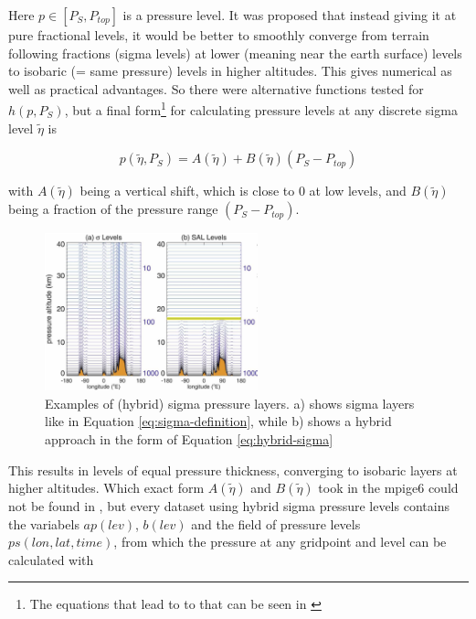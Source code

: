 Here $p \in [P_S, P_{top}]$ is a pressure level. 
It was proposed that instead giving it at pure fractional levels, it would be better to smoothly converge from terrain following fractions (sigma levels) at lower (meaning near the earth surface) levels to isobaric (= same pressure) levels in higher altitudes. 
This gives numerical as well as practical advantages.
So there were alternative functions tested for $h(p, P_S)$, but a final form\footnote{The equations that lead to to that can be seen in \cite{eckermann_hybrid_2009}} for calculating pressure levels at any discrete sigma level $\tilde{\eta}$ is

\begin{equation}
\label{eq:hybrid-sigma}
p(\tilde{\eta}, P_S) = A(\tilde{\eta}) + B(\tilde{\eta}) (P_S - P_{top})
\end{equation}


with $A(\tilde{\eta})$ being a vertical shift, which is close to 0 at low levels, and $B(\tilde{\eta})$ being a fraction of the pressure range $(P_S - P_{top})$. 

\begin{figure}
  \begin{center}
    \includegraphics[width=0.55\textwidth]{figures/hybrid_sigma_pressure_layers.png}
  \end{center}
  \caption{Examples of (hybrid) sigma pressure layers. a) shows sigma layers like in Equation \ref{eq:sigma-definition}, while b) shows a hybrid approach in the form of Equation \ref{eq:hybrid-sigma} \cite{eckermann_hybrid_2009}}\label{fig:hybrid-sigma}
\end{figure}



This results in levels of equal pressure thickness, converging to isobaric layers at higher altitudes. 
Which exact form $A(\tilde{\eta})$ and $B(\tilde{\eta})$ took in the \ac{mpige6} could not be found in \cite{olonscheck_new_2023}, but every dataset using hybrid sigma pressure levels contains the variabels $ap(lev)$, $b(lev)$ and the field of pressure levels $ps(lon, lat, time)$, from which the pressure at any gridpoint and level can be calculated with 

